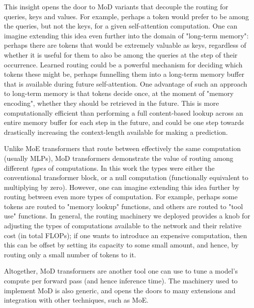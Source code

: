 \documentclass[11pt, a4paper, onecolumn, logo, copyright]{googledeepmind}
\begin{document}
This insight opens the door to MoD variants that decouple the routing for queries, keys and values. For example, perhaps a token would prefer to be among the queries, but not the keys, for a given self-attention computation. One can imagine extending this idea even further into the domain of "long-term memory": perhaps there are tokens that would be extremely valuable as keys, regardless of whether it is useful for them to also be among the queries at the step of their occurrence. Learned routing could be a powerful mechanism for deciding which tokens these might be, perhaps funnelling them into a long-term memory buffer that is available during future self-attention. One advantage of such an approach to long-term memory is that tokens decide once, at the moment of "memory encoding", whether they should be retrieved in the future. This is more computationally efficient than performing a full content-based lookup across an entire memory buffer for each step in the future, and could be one step towards drastically increasing the context-length available for making a prediction.

Unlike MoE transformers that route between effectively the same computation (usually MLPs), MoD transformers demonstrate the value of routing among different \textit{types} of computations. In this work the types were either the conventional transformer block, or a null computation (functionally equivalent to multiplying by zero). However, one can imagine extending this idea further by routing between even more types of computation. For example, perhaps some tokens are routed to "memory lookup" functions, and others are routed to "tool use" functions. In general, the routing machinery we deployed provides a knob for adjusting the types of computations available to the network and their relative cost (in total FLOPs); if one wants to introduce an expensive computation, then this can be offset by setting its capacity to some small amount, and hence, by routing only a small number of tokens to it.

Altogether, MoD transformers are another tool one can use to tune a model's compute per forward pass (and hence inference time). The machinery used to implement MoD is also generic, and opens the doors to many extensions and integration with other techniques, such as MoE.

\end{document}
